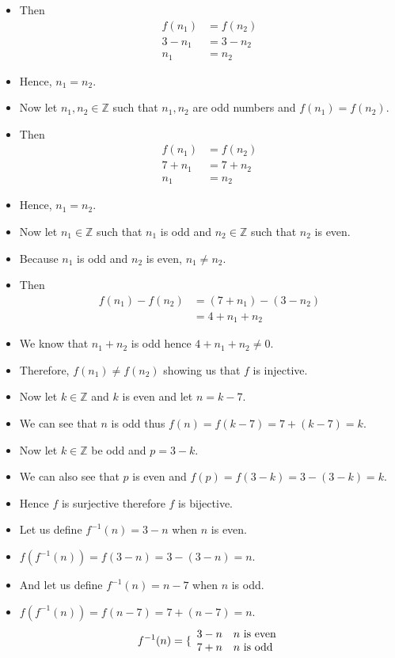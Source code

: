 \documentclass[letterpaper,12pt]{article}
\begin{document}
\begin{enumerate}
\begin{itemize}
	\item Then
	\begin{align}
		f(n_1) &= f(n_2) \\3-n_1 &= 3-n_2\\n_1 &=n_2
	\end{align}
	\item Hence, $n_1= n_2$.
	\item Now let $n_1,n_2 \in \mathbb{Z}$ such that $n_1,n_2$ are odd numbers and $f(n_1) = f(n_2)$.
	\item Then
	\begin{align}
	f(n_1) &= f(n_2) \\ 7+n_1 &= 7+n_2\\n_1&=n_2	
	\end{align}
	\item Hence, $n_1=n_2$.
	\item Now let $n_1 \in \mathbb{Z}$ such that $n_1$ is odd and $n_2 \in \mathbb{Z}$ such that $n_2$ is even.
	\item Because $n_1$ is odd and $n_2$ is even, $n_1 \neq n_2$.
	\item Then
	\begin{align}
		f(n_1) -f(n_2) &=(7+n_1)-(3-n_2) \\ &=4+n_1+n_2
	\end{align}
	\item We know that $n_1 + n_2$ is odd hence $4+n_1+n_2 \neq 0$.
	\item Therefore, $f(n_1) \neq f(n_2)$ showing us that $f$ is injective.
	\item Now let $k \in \mathbb{Z}$ and $k$ is even and let $n=k-7$.
	\item We can see that $n$ is odd thus $f(n)=f(k-7)=7+(k-7) = k$.
	\item Now let $k\in \mathbb{Z}$ be odd and $p = 3-k$.
	\item We can also see that $p$ is even and  $f(p) = f(3-k)=3-(3-k) = k.$
	\item Hence $f$ is surjective therefore $f $ is bijective.
	\item Let us define $f^{-1}(n) = 3-n$ when $n$ is even.
	\item $f(f^{-1}(n)) = f(3-n) = 3-(3-n) = n$.
	\item And let us define $f^{-1}(n) = n-7$ when $n$ is odd.
	\item $f(f^{-1}(n)) = f(n-7) = 7+(n-7) = n$.
	\begin{equation*}
	f^{-1}(n) = \{ \begin{array}{ll}
	3-n & n $ is even$ \\ 7+n &n $ is odd$
	\end{array}	
	\end{equation*}


\end{itemize}
\end{enumerate}
\end{document}
